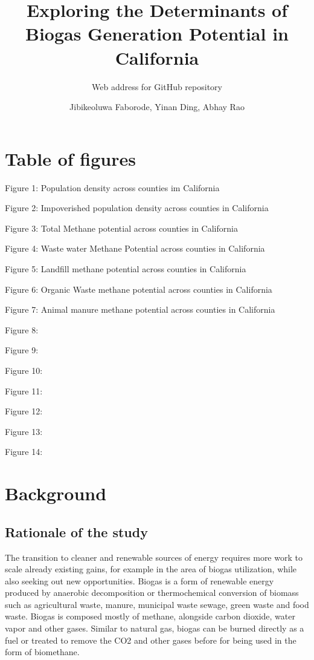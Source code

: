 \documentclass[
  12pt,
]{article}
\title{Exploring the Determinants of Biogas Generation Potential in
California}
\subtitle{Web address for GitHub repository}
\author{Jibikeoluwa Faborode, Yinan Ding, Abhay Rao}
\date{}
\begin{document}
\maketitle

\newpage
\tableofcontents 
\newpage
\listoftables 
\newpage
\listoffigures 


\newpage

\hypertarget{table-of-figures}{%
\section{Table of figures}\label{table-of-figures}}

Figure 1: Population density across counties im California

Figure 2: Impoverished population density across counties in California

Figure 3: Total Methane potential across counties in California

Figure 4: Waste water Methane Potential across counties in California

Figure 5: Landfill methane potential across counties in California

Figure 6: Organic Waste methane potential across counties in California

Figure 7: Animal manure methane potential across counties in California

Figure 8:

Figure 9:

Figure 10:

Figure 11:

Figure 12:

Figure 13:

Figure 14:

\newpage

\hypertarget{background}{%
\section{Background}\label{background}}

\hypertarget{rationale-of-the-study}{%
\subsection{Rationale of the study}\label{rationale-of-the-study}}

The transition to cleaner and renewable sources of energy requires more
work to scale already existing gains, for example in the area of biogas
utilization, while also seeking out new opportunities. Biogas is a form
of renewable energy produced by anaerobic decomposition or
thermochemical conversion of biomass such as agricultural waste, manure,
municipal waste sewage, green waste and food waste. Biogas is composed
mostly of methane, alongside carbon dioxide, water vapor and other
gases. Similar to natural gas, biogas can be burned directly as a fuel
or treated to remove the CO2 and other gases before for being used in
the form of biomethane.
\end{document}

